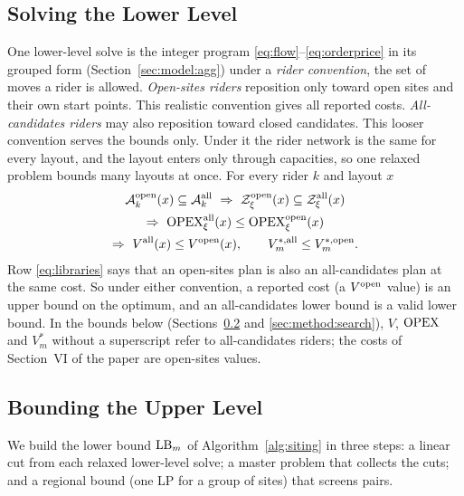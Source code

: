 \subsection{Solving the Lower Level}\label{sec:method:lower}\label{sec:method:riders}
One lower-level solve is the integer program \eqref{eq:flow}--\eqref{eq:orderprice} in its grouped form (Section~\ref{sec:model:agg}) under a \emph{rider convention}, the set of moves a rider is allowed. \emph{Open-sites riders} reposition only toward open sites and their own start points. This realistic convention gives all reported costs. \emph{All-candidates riders} may also reposition toward closed candidates. This looser convention serves the bounds only. Under it the rider network is the same for every layout, and the layout enters only through capacities, so one relaxed problem bounds many layouts at once. For every rider $k$ and layout $x$
\begin{equation}\label{eq:libraries}
  \begin{gathered}
  \mathcal A^{\mathrm{open}}_k(x)\subseteq\mathcal A^{\mathrm{all}}_k\ \Rightarrow\ \mathcal Z^{\mathrm{open}}_\xi(x)\subseteq\mathcal Z^{\mathrm{all}}_\xi(x)\\
  \Rightarrow\ \OPEX^{\mathrm{all}}_\xi(x)\le\OPEX^{\mathrm{open}}_\xi(x)\\
  \Rightarrow\ \Vall(x)\le\Vopen(x),\qquad V^{*,\mathrm{all}}_m\le V^{*,\mathrm{open}}_m .
  \end{gathered}
\end{equation}
Row \eqref{eq:libraries} says that an open-sites plan is also an all-candidates plan at the same cost. So under either convention, a reported cost (a $V^{\mathrm{open}}$ value) is an upper bound on the optimum, and an all-candidates lower bound is a valid lower bound. In the bounds below (Sections~\ref{sec:method:bounds} and \ref{sec:method:search}), $V$, $\mathrm{OPEX}$ and $V^*_m$ without a superscript refer to all-candidates riders; the costs of Section~VI of the paper are open-sites values.

\subsection{Bounding the Upper Level}\label{sec:method:bounds}\label{sec:method:master}\label{sec:method:regional}
We build the lower bound $\mathrm{LB}_m$ of Algorithm~\ref{alg:siting} in three steps: a linear cut from each relaxed lower-level solve; a master problem that collects the cuts; and a regional bound (one LP for a group of sites) that screens pairs.

